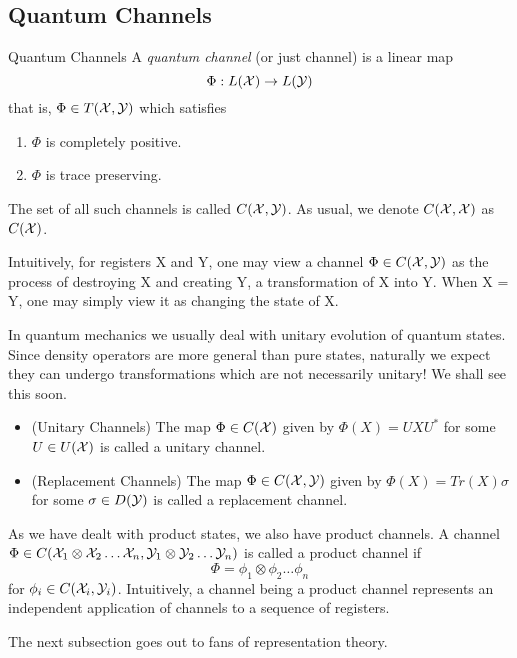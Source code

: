 \subsection{Quantum Channels}
\begin{definition}{Quantum Channels}
A \textit{quantum channel} (or just channel) is a linear map
\[\Phi: L(\mathcal{X})\to L(\mathcal{Y})\]
that is, $\Phi\in T(\mathcal{X},\mathcal{Y})$ which satisfies
\begin{enumerate}
    \item $\Phi$ is completely positive.
    \item $\Phi$ is trace preserving.
\end{enumerate}
\end{definition}
The set of all such channels is called $C(\mathcal{X},\mathcal{Y})$. As usual, we denote $C(\mathcal{X},\mathcal{X})$ as $C(\mathcal{X})$. 

\noindent Intuitively, for registers \textsf{X} and \textsf{Y}, one may view a channel $\Phi \in C(\mathcal{X},\mathcal{Y})$ as the process of destroying \textsf{X} and creating \textsf{Y}, a transformation of \textsf{X} into \textsf{Y}. When \textsf{X = Y}, one may simply view it as changing the state of \textsf{X}.
\begin{pfact}
In quantum mechanics we usually deal with unitary evolution of quantum states. Since density operators are more general than pure states, naturally we expect they can undergo transformations which are not necessarily unitary! We shall see this soon.
\end{pfact}
\begin{example}
\hphantom{as}
\begin{itemize}
\item (Unitary Channels) The map $\Phi\in C(\mathcal{X})$ given by $\Phi(X) = UXU^*$ for some $U\in U(\mathcal{X})$ is called a unitary channel.
    \item (Replacement Channels) The map $\Phi\in C(\mathcal{X},\mathcal{Y})$ given by $\Phi(X) = Tr(X)\sigma$ for some $\sigma\in D(\mathcal{Y})$ is called a replacement channel.
\end{itemize}
\end{example}
As we have dealt with product states, we also have product channels. A channel $\Phi\in C(\mathcal{X}_1\otimes\mathcal{X}_2\dots\mathcal{X}_n,\mathcal{Y}_1\otimes\mathcal{Y}_2\dots\mathcal{Y}_n)$ is called a product channel if 
\[\Phi = \phi_1\otimes\phi_2\dots\phi_n\]
for $\phi_i\in C(\mathcal{X}_i,\mathcal{Y}_i)$. Intuitively, a channel being a product channel represents an independent application of channels to a sequence of registers.


\noindent The next subsection goes out to fans of representation theory.
